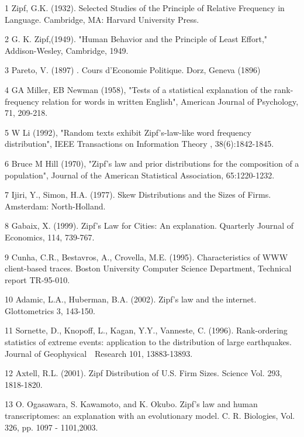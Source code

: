 \documentclass[10pt,a4paper]{article}
\begin{document}
\begin{thebibliography}{99a}
\item[1] Zipf, G.K. (1932). Selected Studies of the Principle of Relative Frequency in Language. Cambridge, MA: Harvard University Press.

\item[2] G. K. Zipf,(1949). "Human Behavior and the Principle of Least Effort," Addison-Wesley, Cambridge, 1949.

\item[3] Pareto, V. (1897) . Cours d'Economie Politique.  Dorz, Geneva (1896)

\item[4] GA Miller, EB Newman (1958), "Tests of a statistical explanation of the rank-frequency relation for words in written English", American Journal of Psychology, 71, 209-218. 

\item[5] W Li (1992), "Random texts exhibit Zipf's-law-like word frequency distribution", IEEE Transactions on Information Theory , 38(6):1842-1845.

\item[6] Bruce M Hill (1970), "Zipf's law and prior distributions for the composition of a population", Journal of the American Statistical Association, 65:1220-1232.

\item[7] Ijiri, Y., Simon, H.A. (1977). Skew Distributions and the Sizes of Firms. Amsterdam: North-Holland.

\item[8] Gabaix, X. (1999). Zipf's Law for Cities: An explanation. Quarterly Journal of Economics, 114, 739-767. 

\item[9] Cunha, C.R., Bestavros, A., Crovella, M.E. (1995). Characteristics of WWW client-based traces. Boston University Computer Science Department, Technical report TR-95-010. 

\item[10] Adamic, L.A., Huberman, B.A. (2002). Zipf's law and the internet. Glottometrics 3, 143-150.

\item[11] Sornette, D., Knopoff, L., Kagan, Y.Y., Vanneste, C. (1996). Rank-ordering statistics of extreme events: application to the distribution of large earthquakes. Journal of Geophysical　Research 101, 13883-13893.

\item[12] Axtell, R.L. (2001). Zipf Distribution of U.S. Firm Sizes. Science Vol. 293, 1818-1820.
\item[13] O. Ogasawara, S. Kawamoto, and K. Okubo. Zipf's law and human transcriptomes: an explanation with an evolutionary model. C. R. Biologies, Vol. 326, pp. 1097 - 1101,2003.


\end{thebibliography}
\end{document}
